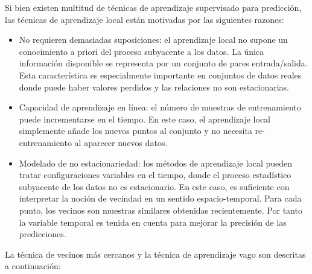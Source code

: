 \documentclass{llncs}
\begin{document}
Si bien existen multitud de técnicas de aprendizaje supervisado para predicción, las técnicas de aprendizaje local están motivadas por las siguientes razones:
\begin{itemize}

\item No requieren demasiadas suposiciones: el aprendizaje local no supone un conocimiento a priori del proceso subyacente a los datos. La única información disponible se representa por un conjunto de pares entrada/salida. Esta característica es especialmente importante en conjuntos de datos reales donde puede haber valores perdidos y las relaciones no son estacionarias. 

\item Capacidad de aprendizaje en línea: el número de muestras de entrenamiento puede incrementarse en el tiempo. En este caso, el aprendizaje local simplemente añade los nuevos puntos al conjunto y no necesita re-entrenamiento al aparecer nuevos datos.

\item Modelado de no estacionariedad: los métodos de aprendizaje local pueden tratar configuraciones variables en el tiempo, donde el proceso estadístico subyacente de los datos no es estacionario. En este caso, es suficiente con interpretar la noción de vecindad en un sentido espacio-temporal. Para cada punto, los vecinos son muestras similares obtenidas recientemente. Por tanto la variable temporal es tenida en cuenta para mejorar la precisión de las predicciones.
\end{itemize}
La técnica de vecinos más cercanos y la técnica de aprendizaje vago son descritas a continuación:
\end{document}
